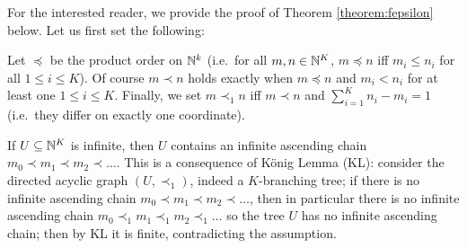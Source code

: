 For the interested reader, we provide the proof of Theorem \ref{theorem:fepsilon} below. Let us first set the following:
\begin{definition}
 Let $\preceq$ be the product order on $\mathbb{N}^k$ (i.e.\ for all $ m  , n  \in \mathbb{N}^{K}$, $ m  \preceq  n  $ iff $m_{i}\leq n_{i}$ for all $1\leq i\leq K$).
 Of course $ m  \prec  n  $ holds exactly when $ m  \preceq  n  $ and $m_{i}<n_{i}$ for at least one $1\leq i\leq K$.
 Finally, we set $ m  \prec_{1} n  $  iff
$ m  \prec  n  $ and $\sum_{i=1}^{K}n_{i}-m_{i}=1$ (i.e.\ they differ on exactly one coordinate).
\end{definition}


\begin{remark}\label{rmk:AC}
If $U\subseteq \mathbb{N}^{K}$ is infinite, then $U$ contains an infinite ascending chain $ m  _{0}\prec  m  _{1} \prec  m  _{2} \prec \dots$.
This is a consequence of K\"onig Lemma (KL): consider the directed acyclic graph $(U,\prec_{1})$, indeed a $K$-branching tree; if there is no infinite ascending chain $  m  _{0}\prec  m  _{1} \prec  m  _{2} \prec \dots$, then in particular there is no infinite ascending chain $  m  _{0}\prec_{1}  m  _{1} \prec_{1}  m  _{2} \prec_{1} \dots$ so the tree $U$ has no infinite ascending chain; then by KL it is finite, contradicting the assumption. 
\end{remark}


